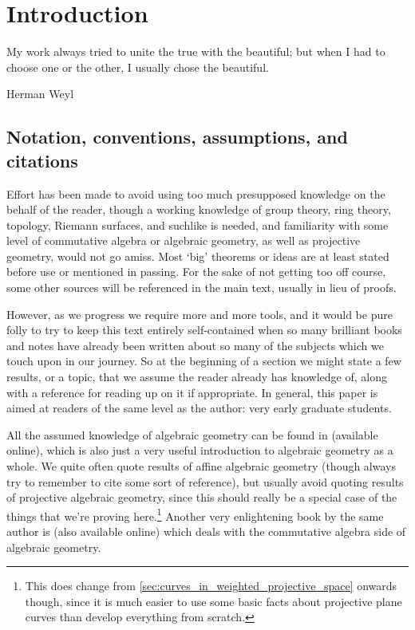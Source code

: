 \documentclass[10pt,notitlepage]{article}
\numberwithin{equation}{subsection}
\begin{document}
    \clearpage


\section{Introduction} %
\label{sec:introduction}


    \epigraph{
        My work always tried to unite the true with the beautiful; but when I had to choose one or the other, I usually chose the beautiful.
    }{Herman Weyl}

    \vspace{-2em}
    
    \subsection{Notation, conventions, assumptions, and citations} %
    \label{sub:notation_and_conventions}

    Effort has been made to avoid using too much presupposed knowledge on the behalf of the reader, though a working knowledge of group theory, ring theory, topology, Riemann surfaces, and suchlike is needed, and familiarity with some level of commutative algebra or algebraic geometry, as well as projective geometry, would not go amiss.
    Most `big' theorems or ideas are at least stated before use or mentioned in passing.
    For the sake of not getting too off course, some other sources will be referenced in the main text, usually in lieu of proofs.

    However, as we progress we require more and more tools, and it would be pure folly to try to keep this text entirely self-contained when so many brilliant books and notes have already been written about so many of the subjects which we touch upon in our journey.
    So at the beginning of a section we might state a few results, or a topic, that we assume the reader already has knowledge of, along with a reference for reading up on it if appropriate.
    In general, this paper is aimed at readers of the same level as the author: very early graduate students.

    \bigskip

    All the assumed knowledge of algebraic geometry can be found in \cite{Reid:1988wa} (available online), which is also just a very useful introduction to algebraic geometry as a whole.
    We quite often quote results of affine algebraic geometry (though always try to remember to cite some sort of reference), but usually avoid quoting results of projective algebraic geometry, since this should really be a special case of the things that we're proving here.\footnote{%
        This does change from \cref{sec:curves_in_weighted_projective_space} onwards though, since it is much easier to use some basic facts about projective plane curves than develop everything from scratch.
    }
    Another very enlightening book by the same author is \cite{Reid:1995tu} (also available online) which deals with the commutative algebra side of algebraic geometry.
\end{document}
